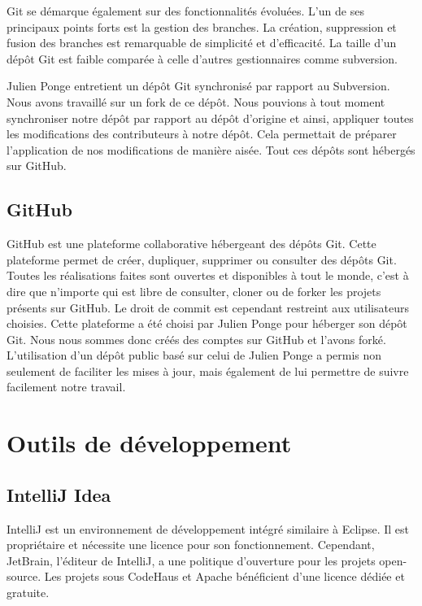 Git se démarque également sur des fonctionnalités évoluées.
L'un de ses principaux points forts est la gestion des branches.
La création, suppression et fusion des branches est remarquable de simplicité et d'efficacité.
La taille d'un dépôt Git est faible comparée à celle d'autres gestionnaires comme subversion.

Julien Ponge entretient un dépôt Git synchronisé par rapport au Subversion. 
Nous avons travaillé sur un fork de ce dépôt.
Nous pouvions à tout moment synchroniser notre dépôt par rapport au dépôt d'origine et ainsi, appliquer toutes les modifications des contributeurs à notre dépôt.
Cela permettait de préparer l'application de nos modifications de manière aisée. Tout ces dépôts sont hébergés sur GitHub.
\subsection{GitHub}
GitHub est une plateforme collaborative hébergeant des dépôts Git.
Cette plateforme permet de créer, dupliquer, supprimer ou consulter des dépôts Git.
Toutes les réalisations faites sont ouvertes et disponibles à tout le monde, c'est à dire que n'importe qui est libre de consulter, cloner ou de forker les projets présents sur GitHub.
Le droit de commit est cependant restreint aux utilisateurs choisies.
Cette plateforme a été choisi par Julien Ponge pour héberger son dépôt Git.
Nous nous sommes donc créés des comptes sur GitHub et l'avons forké.
L'utilisation d'un dépôt public basé sur celui de Julien Ponge a permis non seulement de faciliter les mises à jour, mais également de lui permettre de suivre facilement notre travail.
\section{Outils de développement}
\subsection{IntelliJ Idea}
IntelliJ est un environnement de développement intégré similaire à Eclipse.
Il est propriétaire et nécessite une licence pour son fonctionnement.
Cependant, JetBrain, l'éditeur de IntelliJ, a une politique d'ouverture pour les projets open-source.
Les projets sous CodeHaus et Apache bénéficient d'une licence dédiée et gratuite.

